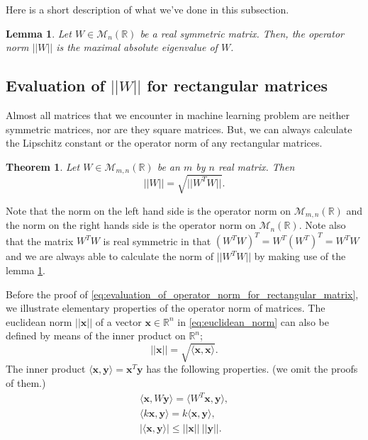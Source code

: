 \documentclass[11pt]{report}
\newtheorem{theorem}{Theorem} %
\newtheorem{lemma}{Lemma} %
\newcommand\bx{\ensuremath{\boldsymbol x}}
\newcommand\by{\ensuremath{\boldsymbol y}}
\begin{document}
Here is a short description of what we've done in this subsection.
\begin{lemma}\label{lemm:evaluation_for_square_matrices}
Let \(W\in\mathcal M_n(\mathbb R)\) be a real symmetric matrix.
Then, the operator norm \(||W||\) is the maximal absolute eigenvalue of \(W\).
\end{lemma}

%
\subsection{Evaluation of \(||W||\) for rectangular matrices}\label{sec:evaluation_for_rectangular_matrices}
Almost all matrices that we encounter in machine learning problem are neither symmetric matrices, nor are they square matrices.
But, we can always calculate the Lipschitz constant or the operator norm of any rectangular matrices.

\begin{theorem}\label{theo:evaluation_for_rectangular_matrices}
\cite{KC}
Let \(W\in\mathcal M_{m,n}(\mathbb R)\) be an \(m\) by \(n\) real matrix.
Then
\begin{equation}\label{eq:evaluation_of_operator_norm_for_rectangular_matrix}
||W||=\sqrt{||W^TW||}.
\end{equation}
\end{theorem}

Note that the norm on the left hand side is the operator norm on \(\mathcal M_{m,n}(\mathbb R)\) and the norm on the right hands side is the operator norm on \(\mathcal M_n(\mathbb R)\).
Note also that the matrix \(W^TW\) is real symmetric in that \((W^TW)^T=W^T(W^T)^T=W^TW\) and we are always able to calculate the norm of \(||W^TW||\) by making use of the lemma \ref{lemm:evaluation_for_square_matrices}.

Before the proof of \eqref{eq:evaluation_of_operator_norm_for_rectangular_matrix}, we illustrate elementary properties of the operator norm of matrices.
The euclidean norm \(||\bx||\) of a vector \(\bx\in\mathbb R^n\) in \eqref{eq:euclidean_norm} can also be defined by means of the inner product on \(\mathbb R^n\);
\begin{equation}\label{eq:euclidean norm_2}
||\bx||=\sqrt{\langle \bx,\bx\rangle}.
\end{equation}
The inner product \(\langle \bx,\by\rangle=\bx^T\by\) has the following properties. (we omit the proofs of them.)
\begin{gather*}
\langle \bx,W\by\rangle=\langle W^T\bx,\by\rangle,\\
\langle k\bx,\by\rangle=k\langle \bx,\by\rangle,\\
|\langle\bx,\by\rangle|\le||\bx||\:||\by||.
\end{gather*}
\end{document}
